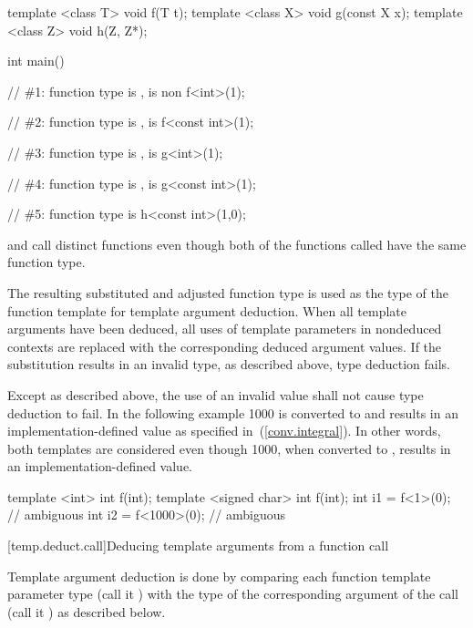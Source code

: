 \begin{codeblock}
template <class T> void f(T t);
template <class X> void g(const X x);
template <class Z> void h(Z, Z*);

int main()
{
	// \#1: function type is ,  is non 
	f<int>(1);

	// \#2: function type is ,  is 
	f<const int>(1);

	// \#3: function type is ,  is 
	g<int>(1);

	// \#4: function type is ,  is 
	g<const int>(1);

	// \#5: function type is 
	h<const int>(1,0);
}
\end{codeblock}
\exitexampleb
\enternote
{} and  call distinct functions
even though both of the functions called have the same function type.
\exitnoteb

\pnum
The resulting substituted and adjusted function type is used as
the type of the function template for template argument deduction.
When all template arguments have been deduced, all uses of template
parameters in nondeduced contexts are replaced with the corresponding deduced
argument values. If the substitution results in an
invalid type, as described above, type deduction fails.

\pnum
Except as described above, the use of an invalid value shall not cause
type deduction to fail.
\enterexample
In the following example 1000 is converted to  and results
in an implementation-defined value as specified in~(\ref{conv.integral}).
In other words, both templates are considered even though 1000,
when converted to , results in an implementation-defined
value.

\begin{codeblock}
template <int> int f(int);
template <signed char> int f(int);
int i1 = f<1>(0);               // ambiguous
int i2 = f<1000>(0);            // ambiguous
\end{codeblock}
\exitexampleb

[temp.deduct.call]{Deducing template arguments from a function call}

\pnum
Template argument deduction is done by comparing each function
template parameter type (call it
)
with the type of the corresponding argument of the call (call it
)
as described below.

